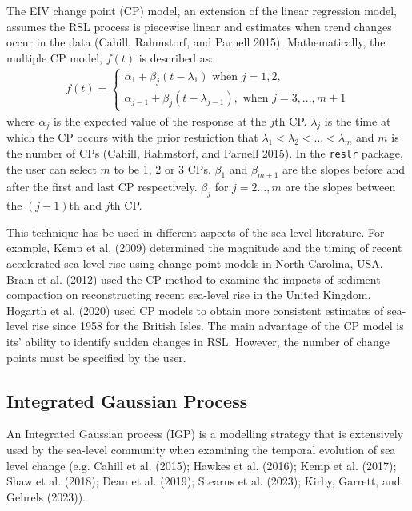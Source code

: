 The EIV change point (CP) model, an extension of the linear regression model, assumes the RSL process is piecewise linear and estimates when trend changes occur in the data (Cahill, Rahmstorf, and Parnell 2015). Mathematically, the multiple CP model, \(f(t)\) is described as:
\begin{align}
     f(t) = 
     \begin{cases}
      \alpha_1 + \beta_j(t - \lambda_1) \text{ when } j = 1,2,\\
      \alpha_{j-1} + \beta_j(t - \lambda_{j-1}),  \text{ when } j = 3,..., m+1
    \end{cases}
 \end{align}
where \(\alpha_j\) is the expected value of the response at the \(j\)th CP. \(\lambda_j\) is the time at which the CP occurs with the prior restriction that \(\lambda_1 < \lambda_2 < ... < \lambda_m\) and \(m\) is the number of CPs (Cahill, Rahmstorf, and Parnell 2015). In the \texttt{reslr} package, the user can select \(m\) to be 1, 2 or 3 CPs. \(\beta_{1}\) and \(\beta_{m+1}\) are the slopes before and after the first and last CP respectively. \(\beta_j\) for \(j=2\ldots,m\) are the slopes between the \((j-1)\)th and \(j\)th CP.

This technique has be used in different aspects of the sea-level literature. For example, Kemp et al. (2009) determined the magnitude and the timing of recent accelerated sea-level rise using change point models in North Carolina, USA. Brain et al. (2012) used the CP method to examine the impacts of sediment compaction on reconstructing recent sea-level rise in the United Kingdom. Hogarth et al. (2020) used CP models to obtain more consistent estimates of sea-level rise since 1958 for the British Isles. The main advantage of the CP model is its' ability to identify sudden changes in RSL. However, the number of change points must be specified by the user.

\hypertarget{integratedgaussianprocess}{%
\subsection{Integrated Gaussian Process}\label{integratedgaussianprocess}}

An Integrated Gaussian process (IGP) is a modelling strategy that is extensively used by the sea-level community when examining the temporal evolution of sea level change (e.g. Cahill et al. (2015); Hawkes et al. (2016); Kemp et al. (2017); Shaw et al. (2018); Dean et al. (2019); Stearns et al. (2023); Kirby, Garrett, and Gehrels (2023)).

